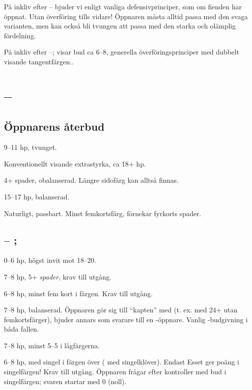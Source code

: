 P{\aa} inkliv efter -- bjuder vi enligt vanliga defensivprinciper, 
som om fienden har {\"o}ppnat. Utan överföring tills vidare!
{\"O}ppnaren m{\aa}sta alltid passa med den svaga 
varianten, men kan ocks{\aa} bli tvungen att passa med den 
starka och ol{\"a}mplig
f{\"o}rdelning.

P{\aa} inkliv efter --;  visar bud 
ca 6--8, generella överföringsprinciper med dubbelt visande tangentfärgen..

\section{ -- }

\subsection{\"Oppnarens {\aa}terbud}

\bbe
   \item[pass] 9--11 hp, tvunget.
   \item[\hj{1}] Konventionellt visande extrastyrka, ca 18+ hp.
   \item[\spa{1}] 4+ spader, obalanserad. Längre sidofärg kan alltså finnas.
   \item[\NT{1}] 15--17 hp, balanserad.
   \item[\la{2}, \hj{2}] Naturligt, passbart. Minst femkortsf\"arg,
   förnekar fyrkorts spader.
\ebe

\subsection{ -- ; }

\bbe
   \item[\spa{1}] 0--6 hp, h\"ogst invit mot 18--20.
   \item[\NT{1}] 7--8 hp, 5+ \emph{spader}, krav till utg{\aa}ng.
   \item[\la{2} \hj{2}] 6--8 hp, minst fem kort i f\"argen. Krav 
                        till utg{\aa}ng.
   \item[\spa{2}] 7--8 hp, balanserad. Öppnaren g\"or sig till ``kapten''
                  med  (t. ex. med 24+ utan femkortsf\"arger),
                  bjuder annars som svarare till en
                  -\"oppnare. Vanlig -budgivning i båda fallen.
   \item[\NT{2}] 7--8 hp, minst 5--5 i l{\aa}gf\"argerna.
   \item[\la{3}, \ho{3}] 6--8 hp,  med singel i
                  f\"argen \"over ( med singelkl\"over). Endast Esset
                  ger po\"ang i singelf\"argen!
                  Krav till utg{\aa}ng. Öppnaren fr{\aa}gar efter kontroller
                  med bud i singelf\"argen; svaren startar med 0 (noll).
\ebe

